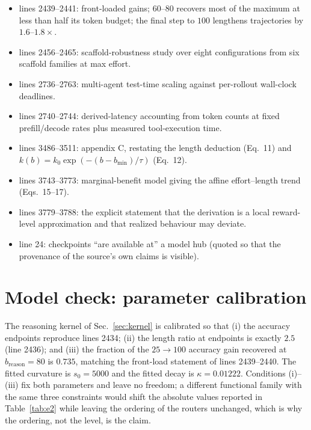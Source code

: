 \documentclass[10pt]{article} %
\newcommand{\eff}{b}
\newcommand{\reff}{\eff_{\mathrm{reason}}}
\begin{document}
\begin{itemize}
\item lines 2439--2441: front-loaded gains; $60$--$80$ recovers most of the
  maximum at less than half its token budget; the final step to $100$ lengthens
  trajectories by $1.6$--$1.8\times$.
\item lines 2456--2465: scaffold-robustness study over eight configurations from
  six scaffold families at max effort.
\item lines 2736--2763: multi-agent test-time scaling against per-rollout
  wall-clock deadlines.
\item lines 2740--2744: derived-latency accounting from token counts at fixed
  prefill/decode rates plus measured tool-execution time.
\item lines 3486--3511: appendix C, restating the length deduction (Eq.~11) and
  $k(\eff)=k_0\exp\left(-(\eff-\eff_{\min})/\tau\right)$ (Eq.~12).
\item lines 3743--3773: marginal-benefit model giving the affine effort--length
  trend (Eqs.~15--17).
\item lines 3779--3788: the explicit statement that the derivation is a local
  reward-level approximation and that realized behaviour may deviate.
\item line 24: checkpoints ``are available at'' a model hub (quoted so that the
  provenance of the source's own claims is visible).
\end{itemize}

\section{Model check: parameter calibration}
\label{app:calibration}

The reasoning kernel of Sec.~\ref{sec:kernel} is calibrated so that
(i) the accuracy endpoints reproduce lines 2434; (ii) the length ratio at
endpoints is exactly $2.5$ (line 2436); and (iii) the fraction of the
$25\to100$ accuracy gain recovered at $\reff=80$ is $0.735$, matching the
front-load statement of lines 2439--2440. The fitted curvature is $s_0=5000$ and
the fitted decay is $\kappa=0.01222$. Conditions (i)--(iii) fix both parameters
and leave no freedom; a different functional family with the same three
constraints would shift the absolute values reported in Table~\ref{tab:e2} while
leaving the ordering of the routers unchanged, which is why the ordering, not the
level, is the claim.
\end{document}
